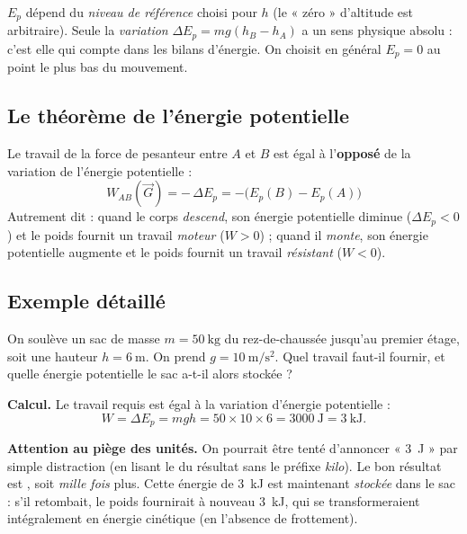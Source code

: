 \documentclass[11pt,a4paper]{article}
\newcommand{\vv}[1]{\vec{#1}}
\begin{document}
\begin{attention}
$E_p$ dépend du \emph{niveau de référence} choisi pour $h$ (le « zéro » d'altitude est arbitraire).
Seule la \emph{variation} $\Delta E_p=mg(h_B-h_A)$ a un sens physique absolu : c'est elle qui compte
dans les bilans d'énergie. On choisit en général $E_p=0$ au point le plus bas du mouvement.
\end{attention}

\subsection{Le théorème de l'énergie potentielle}

\begin{theoreme}
Le travail de la force de pesanteur entre $A$ et $B$ est égal à l'\textbf{opposé} de la variation de
l'énergie potentielle :
\[
\boxed{\;W_{AB}(\vv G)=-\,\Delta E_p=-\bigl(E_p(B)-E_p(A)\bigr)\;}
\]
Autrement dit : quand le corps \emph{descend}, son énergie potentielle diminue ($\Delta E_p<0$) et
le poids fournit un travail \emph{moteur} ($W>0$) ; quand il \emph{monte}, son énergie potentielle
augmente et le poids fournit un travail \emph{résistant} ($W<0$).
\end{theoreme}

\subsection{Exemple détaillé}

\begin{exemple}
On soulève un sac de masse $m=\SI{50}{\kilogram}$ du rez-de-chaussée jusqu'au premier étage, soit
une hauteur $h=\SI{6}{\metre}$. On prend $g=\SI{10}{\metre\per\second\squared}$. Quel travail
faut-il fournir, et quelle énergie potentielle le sac a-t-il alors stockée ?

\smallskip
\textbf{Calcul.} Le travail requis est égal à la variation d'énergie potentielle :
\[
W=\Delta E_p=mgh=50\times10\times6=\SI{3000}{\joule}=\SI{3}{\kilo\joule}.
\]

\textbf{Attention au piège des unités.} On pourrait être tenté d'annoncer « \SI{3}{\joule} » par
simple distraction (en lisant le  \fg{} du résultat sans le préfixe \emph{kilo}). Le bon
résultat est , soit \emph{mille fois} plus. Cette énergie de
\SI{3}{\kilo\joule} est maintenant \emph{stockée} dans le sac : s'il retombait, le poids fournirait à
nouveau \SI{3}{\kilo\joule}, qui se transformeraient intégralement en énergie cinétique (en
l'absence de frottement).
\end{exemple}
\end{document}
